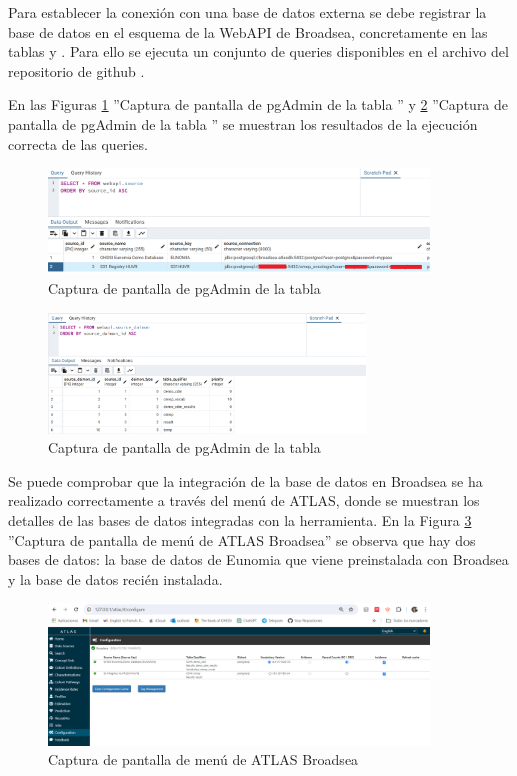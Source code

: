 Para establecer la conexión con una base de datos externa se debe registrar la base de datos en el esquema de la WebAPI de Broadsea, concretamente en las tablas  y . Para ello se ejecuta un conjunto de queries disponibles en el archivo del repositorio de github . 

En las Figuras \ref{figure:sourceHUVR} ''Captura de pantalla de pgAdmin de la tabla '' y \ref{figure:source_daimonHUVR} ''Captura de pantalla de pgAdmin de la tabla '' se muestran los resultados de la ejecución correcta de las queries. 

\begin{figure}[H]
    \centering
    \includegraphics[width=0.90\textwidth]{figures/sourceHUVR.png}
    \caption{Captura de pantalla de pgAdmin de la tabla }
    \label{figure:sourceHUVR}
\end{figure}

\begin{figure}[H]
    \centering
    \includegraphics[width=0.75\textwidth]{figures/source_daimonHUVR.png}
    \caption{Captura de pantalla de pgAdmin de la tabla }
    \label{figure:source_daimonHUVR}
\end{figure}

Se puede comprobar que la integración de la base de datos en Broadsea se ha realizado correctamente a través del menú  de ATLAS, donde se muestran los detalles de las bases de datos integradas con la herramienta. En la Figura \ref{figure:configATLAS} ''Captura de pantalla de menú  de ATLAS Broadsea'' se observa que hay dos bases de datos: la base de datos de Eunomia que viene preinstalada con Broadsea y la base de datos recién instalada.

\begin{figure}[H]
    \centering
    \includegraphics[width=0.90\textwidth]{figures/configATLAS.png}
    \caption{Captura de pantalla de menú  de ATLAS Broadsea}
    \label{figure:configATLAS}
\end{figure}